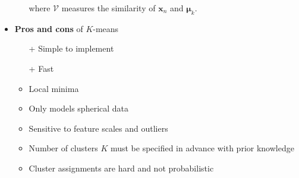 \begin{itemize}
\begin{itemize}
		where $\mathcal{V}$ measures the similarity of $\bm{x}_n$ and $\bm{\mu}_k$.
	\end{itemize}
	\item \textbf{Pros and cons} of $K$-means
	\begin{itemize}
		\item[+] Simple to implement
		\item[+] Fast
		\item Local minima
		\item Only models spherical data 
		\item Sensitive to feature scales and outliers
		\item Number of clusters $K$ must be specified in advance with prior knowledge
		\item Cluster assignments are hard and not probabilistic
	\end{itemize}
\end{itemize}
